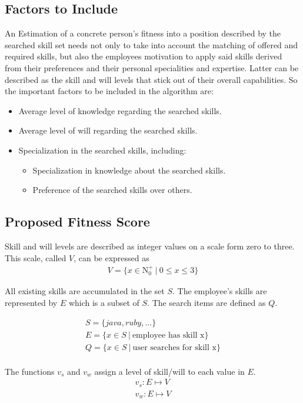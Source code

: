 \subsection{Factors to Include}
An Estimation of a concrete person's fitness into a position described by the searched skill set needs not only to take into account the matching of offered and required skills, but also the employees motivation to apply said skills derived from their preferences and their personal specialities and expertise. Latter can be
described as the skill and will levels that stick out of their overall capabilities. So the important factors to be included in the algorithm are:
\begin{itemize}
  \item Average level of knowledge regarding the searched skills.
  \item Average level of will regarding the searched skills.
  \item Specialization in the searched skills, including:
  \begin{itemize}
    \item Specialization in knowledge about the searched skills.
    \item Preference of the searched skills over others.
  \end{itemize}
\end{itemize}


\subsection{Proposed Fitness Score}
Skill and will levels are described as integer values on a scale form zero to three. This scale, called $V$, can be expressed as
\begin{gather*}
  V = \{ x \in \mathrm{N}_0^+ \ | \  0 \leq x \leq 3\}
\end{gather*}

All existing skills are accumulated in the set $S$. The employee's skills are represented by $E$ which is a subset of $S$. The search items are
defined as $Q$.

\begin{gather*}
  S = \{java, ruby, ...\} \\
  E = \{x \in S \ | \ \textrm{employee has skill x}\} \\
  Q = \{x \in S \ | \ \textrm{user searches for skill x}\} \\
\end{gather*}

The functions $v_s$ and $v_w$ assign a level of skill/will to each value in $E$.
\begin{gather*}
  v_s: E \mapsto V \\
  v_w: E \mapsto V \\
\end{gather*}

